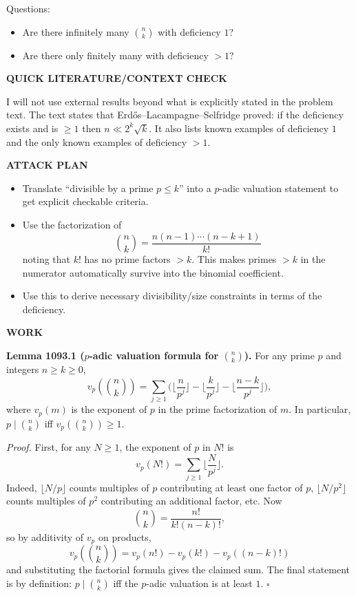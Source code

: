 Questions:
\begin{itemize}
\item Are there infinitely many $\binom{n}{k}$ with deficiency $1$?
\item Are there only finitely many with deficiency $>1$?
\end{itemize}

\textbf{QUICK LITERATURE/CONTEXT CHECK}

I will not use external results beyond what is explicitly stated in the problem text.
The text states that Erd\H{o}s--Lacampagne--Selfridge proved: if the deficiency exists and is $\ge 1$ then $n\ll 2^k\sqrt{k}$.
It also lists known examples of deficiency $1$ and the only known examples of deficiency $>1$.

\textbf{ATTACK PLAN}

\begin{itemize}
\item Translate ``divisible by a prime $p\le k$'' into a $p$-adic valuation statement to get explicit checkable criteria.
\item Use the factorization of
\[\binom{n}{k}=\frac{n(n-1)\cdots(n-k+1)}{k!}
\]
noting that $k!$ has no prime factors $>k$.
This makes primes $>k$ in the numerator automatically survive into the binomial coefficient.
\item Use this to derive necessary divisibility/size constraints in terms of the deficiency.
\end{itemize}

\textbf{WORK}

\textbf{Lemma 1093.1 ($p$-adic valuation formula for $\binom{n}{k}$).}
For any prime $p$ and integers $n\ge k\ge 0$,
\[v_p\!\left(\binom{n}{k}\right)=\sum_{j\ge 1}\Big(\Big\lfloor\frac{n}{p^j}\Big\rfloor-\Big\lfloor\frac{k}{p^j}\Big\rfloor-\Big\lfloor\frac{n-k}{p^j}\Big\rfloor\Big),
\]
where $v_p(m)$ is the exponent of $p$ in the prime factorization of $m$.
In particular, $p\mid \binom{n}{k}$ iff $v_p\!\left(\binom{n}{k}\right)\ge 1$.

\emph{Proof.}
First, for any $N\ge 1$, the exponent of $p$ in $N!$ is
\[v_p(N!)=\sum_{j\ge 1}\Big\lfloor\frac{N}{p^j}\Big\rfloor.
\]
Indeed, $\lfloor N/p\rfloor$ counts multiples of $p$ contributing at least one factor of $p$, $\lfloor N/p^2\rfloor$ counts multiples of $p^2$ contributing an additional factor, etc.
Now
\[\binom{n}{k}=\frac{n!}{k!(n-k)!},
\]
so by additivity of $v_p$ on products,
\[v_p\!\left(\binom{n}{k}\right)=v_p(n!)-v_p(k!)-v_p((n-k)!)
\]
and substituting the factorial formula gives the claimed sum.
The final statement is by definition: $p\mid \binom{n}{k}$ iff the $p$-adic valuation is at least $1$.
\hfill$\square$

